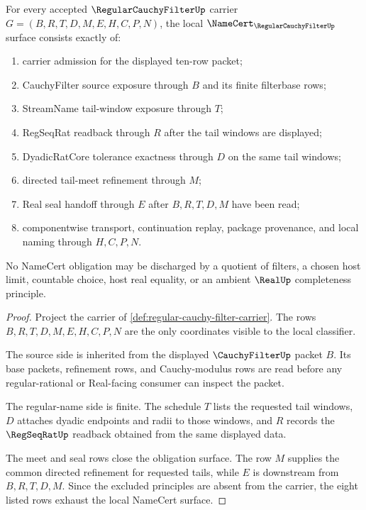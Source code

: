 \begin{theorem}
\label{thm:regular-cauchy-filter-namecert-obligations}
For every accepted $\RegularCauchyFilterUp$ carrier $G=(B,R,T,D,M,E,H,C,P,N)$, the local $\NameCert_{\RegularCauchyFilterUp}$ surface consists exactly of:
\begin{enumerate}
\item carrier admission for the displayed ten-row packet;
\item CauchyFilter source exposure through $B$ and its finite filterbase rows;
\item StreamName tail-window exposure through $T$;
\item RegSeqRat readback through $R$ after the tail windows are displayed;
\item DyadicRatCore tolerance exactness through $D$ on the same tail windows;
\item directed tail-meet refinement through $M$;
\item Real seal handoff through $E$ after $B,R,T,D,M$ have been read;
\item componentwise transport, continuation replay, package provenance, and local naming through $H,C,P,N$.
\end{enumerate}
No NameCert obligation may be discharged by a quotient of filters, a chosen host limit, countable choice, host real equality, or an ambient $\RealUp$ completeness principle.
\end{theorem}
\begin{proof}
Project the carrier of \autoref{def:regular-cauchy-filter-carrier}. The rows $B,R,T,D,M,E,H,C,P,N$ are the only coordinates visible to the local classifier.

The source side is inherited from the displayed $\CauchyFilterUp$ packet $B$. Its base packets, refinement rows, and Cauchy-modulus rows are read before any regular-rational or Real-facing consumer can inspect the packet.

The regular-name side is finite. The schedule $T$ lists the requested tail windows, $D$ attaches dyadic endpoints and radii to those windows, and $R$ records the $\RegSeqRatUp$ readback obtained from the same displayed data.

The meet and seal rows close the obligation surface. The row $M$ supplies the common directed refinement for requested tails, while $E$ is downstream from $B,R,T,D,M$. Since the excluded principles are absent from the carrier, the eight listed rows exhaust the local NameCert surface.
\end{proof}


